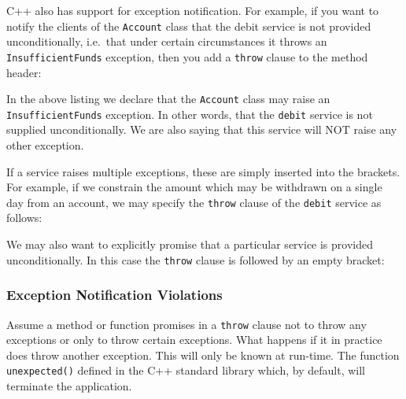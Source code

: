 C++ also has support for exception notification. For example, if you want to
notify the clients of the \verb+Account+ class that the debit service is 
not provided unconditionally, i.e.\ that under certain circumstances it 
throws an \verb+InsufficientFunds+ exception, then you add a \verb+throw+
clause to the method header:


In the above listing we declare that the \verb+Account+ class may raise
an \verb+InsufficientFunds+ exception. In other words, that the \verb+debit+
service is not supplied unconditionally. We are also saying that this
service will NOT raise any other exception.

If a service raises multiple exceptions, these are simply inserted into
the brackets. For example, if we constrain the amount which may be 
withdrawn on a single day from an account, we may specify the \verb+throw+
clause of the \verb+debit+ service as follows:


We may also want to explicitly promise that a particular service is provided
unconditionally. In this case the \verb+throw+ clause is followed by an
empty bracket:



\subsubsection{Exception Notification Violations}

Assume a method or function promises in a \verb+throw+ clause not to throw
any exceptions or only to throw certain exceptions. What happens if it
in practice does throw another exception. This will only be known at
run-time. The function \verb+unexpected()+ defined in the C++ standard
library which, by default, will terminate the application.

